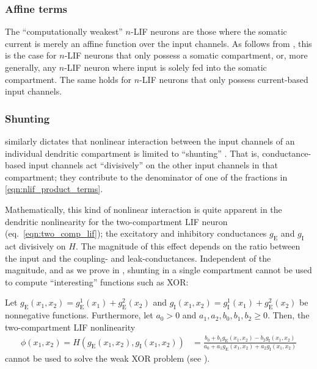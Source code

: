 \subsubsection{Affine terms}
The \enquote{computationally weakest} $n$-LIF neurons are those where the somatic current is merely an affine function over the input channels.
As follows from , this is the case for $n$-LIF neurons that only possess a somatic compartment, or, more generally, any $n$-LIF neuron where input is solely fed into the somatic compartment.
The same holds for $n$-LIF neurons that only possess current-based input channels.

\subsubsection{Shunting}
 similarly dictates that nonlinear interaction between the input channels of an individual dendritic compartment is limited to \enquote{shunting} \citep[cf.][Section~1.5]{koch1999biophysics}.
That is, conductance-based input channels act \enquote{divisively} on the other input channels in that compartment; they contribute to the denominator of one of the fractions in \cref{eqn:nlif_product_terms}.

Mathematically, this kind of nonlinear interaction is quite apparent in the dendritic nonlinearity for the two-compartment LIF neuron (eq.~\ref{eqn:two_comp_lif}); the excitatory and inhibitory conductances $g_\mathrm{E}$ and $g_\mathrm{I}$ act divisively on $H$.
The magnitude of this effect depends on the ratio between the input and the coupling- and leak-conductances.
Independent of the magnitude, and as we prove in , shunting in a single compartment cannot be used to compute \enquote{interesting} functions such as XOR:
\begin{theorem}
\label{thm:two_comp_xor}
Let $g_\mathrm{E}(x_1, x_2) = g_\mathrm{E}^1(x_1) + g_\mathrm{E}^2(x_2)$ and $g_\mathrm{I}(x_1, x_2) = g_\mathrm{I}^1(x_1) + g_\mathrm{E}^2(x_2)$ be nonnegative functions.
Furthermore, let $a_0 > 0$ and $a_1, a_2, b_0, b_1, b_2 \geq 0$.
Then, the two-compartment LIF nonlinearity
\begin{align*}
	\phi(x_1, x_2) = H(g_\mathrm{E}(x_1, x_2), g_\mathrm{I}(x_1, x_2)) &= \frac{b_0 + b_1 g_\mathrm{E}(x_1, x_2) - b_2 g_\mathrm{I}(x_1, x_2)}{a_0 + a_1 g_\mathrm{E}(x_1, x_2) + a_2 g_\mathrm{I}(x_1, x_2)}
\end{align*}
cannot be used to solve the weak XOR problem (see ).
\end{theorem}

